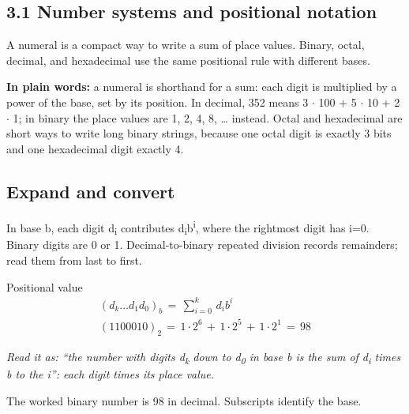 \documentclass[11pt]{article}
\begin{document}
\begin{keepsection}
\section{3.1 Number systems and positional notation}

A numeral is a compact way to write a sum of place values. Binary, octal, decimal, and hexadecimal use the same positional rule with different bases.

\begin{plainbox}\textbf{In plain words:} a numeral is shorthand for a sum: each digit is multiplied by a power of the base, set by its position. In decimal, 352 means 3 \ensuremath{\cdot} 100 + 5 \ensuremath{\cdot} 10 + 2 \ensuremath{\cdot} 1; in binary the place values are 1, 2, 4, 8, … instead. Octal and hexadecimal are short ways to write long binary strings, because one octal digit is exactly 3 bits and one hexadecimal digit exactly 4.\end{plainbox}

\begin{keepsection}
\subsection{Expand and convert}

In base b, each digit d\textsubscript{i} contributes d\textsubscript{i}b\textsuperscript{i}, where the rightmost digit has i=0. Binary digits are 0 or 1. Decimal-to-binary repeated division records remainders; read them from last to first.

\begin{equationcard}{Positional value}
\[ \begin{gathered} ({d}_{{k}}…{d}_{1}{d}_{0})_{{b}}\, =\, \sum_{{i}=0}^{{k}} \, {d}_{{i}}{b}^{{i}} \\ (1100010)_{2}\, =\, 1\cdot 2^{6}\, +\, 1\cdot 2^{5}\, +\, 1\cdot 2^{1}\, =\, 98 \end{gathered} \]
{\small \emph{Read it as: “the number with digits d\textsubscript{k} down to d\textsubscript{0} in base b is the sum of d\textsubscript{i} times b to the i”: each digit times its place value.}\par The worked binary number is 98 in decimal. Subscripts identify the base.}
\end{equationcard}


\end{keepsection}
\end{keepsection}
\end{document}
